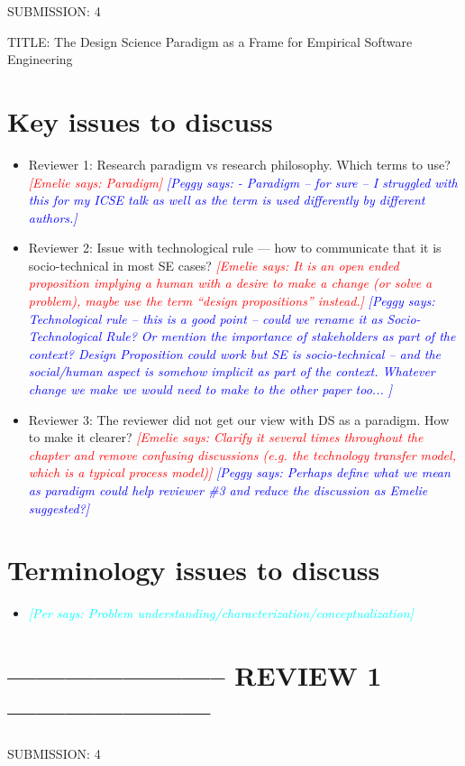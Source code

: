 \documentclass{article}
\newcommand{\emelie}[1]{\textcolor{red}{{\it [Emelie says: #1]}}}
\newcommand{\peggy}[1]{\textcolor{blue}{{\it [Peggy says: #1]}}}
\newcommand{\per}[1]{\textcolor{cyan}{{\it [Per says: #1]}}}
\newcommand{\emelie}[1]{}
\newcommand{\peggy}[1]{}
\newcommand{\per}[1]{}
\begin{document}
SUBMISSION: 4

TITLE: The Design Science Paradigm as a Frame for Empirical Software Engineering

\section*{Key issues to discuss}
\begin{itemize}
\item Reviewer 1: Research paradigm vs research philosophy. Which terms to use?
\emelie{Paradigm}
\peggy{- Paradigm -- for sure -- I struggled with this for my ICSE talk as well as the term is used differently by different authors.}
\item Reviewer 2: Issue with technological rule — how to communicate that it is socio-technical in most SE cases?
\emelie{It is an open ended proposition implying a human with a desire to make a change (or solve a problem), maybe use the term “design propositions” instead.}
\peggy{Technological rule -- this is a good point -- could we rename it as Socio-Technological Rule?  Or mention the importance of stakeholders as part of the context?  Design Proposition could work but SE is socio-technical -- and the social/human aspect is somehow implicit as part of the context.  Whatever change we make we would need to make to the other paper too... }
\item Reviewer 3: The reviewer did not get our view with DS as a paradigm. How to make it clearer?
\emelie{Clarify it several times throughout the chapter and remove confusing discussions (e.g. the technology transfer model, which is a typical process model)}
\peggy{Perhaps define what we mean as paradigm could help reviewer \#3 and reduce the discussion as Emelie suggested?}
\end{itemize}

\section*{Terminology issues to discuss}
\begin{itemize}
\item \per{Problem understanding/characterization/conceptualization}
\end{itemize}
\section*{----------------------- REVIEW 1 ---------------------}

SUBMISSION: 4
\end{document}
